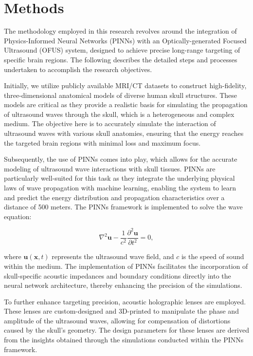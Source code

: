 \documentclass{article}
\begin{document}
\section{Methods}
The methodology employed in this research revolves around the integration of Physics-Informed Neural Networks (PINNs) with an Optically-generated Focused Ultrasound (OFUS) system, designed to achieve precise long-range targeting of specific brain regions. The following describes the detailed steps and processes undertaken to accomplish the research objectives.

Initially, we utilize publicly available MRI/CT datasets to construct high-fidelity, three-dimensional anatomical models of diverse human skull structures. These models are critical as they provide a realistic basis for simulating the propagation of ultrasound waves through the skull, which is a heterogeneous and complex medium. The objective here is to accurately simulate the interaction of ultrasound waves with various skull anatomies, ensuring that the energy reaches the targeted brain regions with minimal loss and maximum focus.

Subsequently, the use of PINNs comes into play, which allows for the accurate modeling of ultrasound wave interactions with skull tissues. PINNs are particularly well-suited for this task as they integrate the underlying physical laws of wave propagation with machine learning, enabling the system to learn and predict the energy distribution and propagation characteristics over a distance of 500 meters. The PINNs framework is implemented to solve the wave equation:

\[
\nabla^2 \mathbf{u} - \frac{1}{c^2} \frac{\partial^2 \mathbf{u}}{\partial t^2} = 0,
\]

where \(\mathbf{u}(\mathbf{x}, t)\) represents the ultrasound wave field, and \(c\) is the speed of sound within the medium. The implementation of PINNs facilitates the incorporation of skull-specific acoustic impedances and boundary conditions directly into the neural network architecture, thereby enhancing the precision of the simulations.

To further enhance targeting precision, acoustic holographic lenses are employed. These lenses are custom-designed and 3D-printed to manipulate the phase and amplitude of the ultrasound waves, allowing for compensation of distortions caused by the skull's geometry. The design parameters for these lenses are derived from the insights obtained through the simulations conducted within the PINNs framework.
\end{document}
